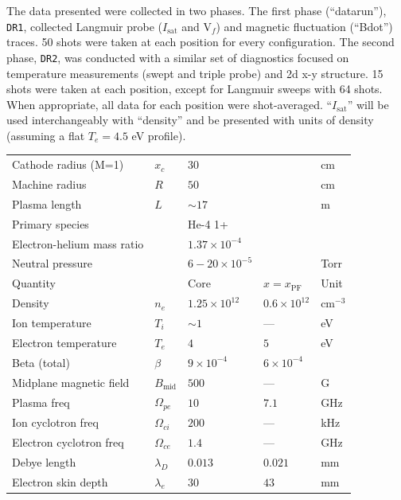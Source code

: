 The data presented were collected in two phases. The first phase (``datarun''), \texttt{DR1}, collected Langmuir probe ($I_\text{sat}$ and V$_f$) and magnetic fluctuation (``Bdot'') \cite{Everson_design_2009} traces. 50 shots were taken at each position for every configuration. 
The second phase, \texttt{DR2}, was conducted with a similar set of diagnostics focused on temperature measurements (swept and triple probe) and 2d x-y structure. 15 shots were taken at each position, except for Langmuir sweeps with 64 shots. When appropriate, all data for each position were shot-averaged.
``$I_\text{sat}$'' will be used interchangeably with ``density'' and be presented with units of density (assuming a flat $T_e = 4.5$ eV profile).

\begin{table}
    \centering
    \setlength\extrarowheight{-6pt}
    \begin{tabular}{l l l l l}
        Cathode radius (M=1) & $x_c$ & $30$ && cm \\
        Machine radius & $R$ & $50$ && cm \\
        Plasma length & $L$ & $\sim 17$ && m \\
        Primary species && He-4 1+ \\ 
        Electron-helium mass ratio && $1.37 \times 10^{-4}$ \\
        Neutral pressure && $6 - 20 \times 10^{-5}$ && Torr \\
        \hline
        Quantity &  & Core & $x=x_\text{PF}$ & Unit \\
        \hline
        Density & $n_e$ &  $1.25 \times 10^{12}$ & $ 0.6 \times 10^{12}$ & $\text{cm}^{-3}$ \\
        Ion temperature & $T_i$ & $\sim 1$ & — & eV \\
        Electron temperature & $T_e$ & $4$ & $5$ & eV \\
        Beta (total) & $\beta$ & $9 \times 10^{-4}$ & $6 \times 10^{-4}$ & \\
        Midplane magnetic field & $B_\text{mid}$ & $500$ & — & G \\
        Plasma freq & $\Omega_{pe}$ & $10$ & $7.1 $& GHz \\
        Ion cyclotron freq & $\Omega_{ci}$ & $200$ & — & kHz \\
        Electron cyclotron freq & $\Omega_{ce}$ & $1.4$ & — & GHz \\
        Debye length & $\lambda_D$ & $0.013$ & $0.021$ & mm \\
        Electron skin depth & $\lambda_{e}$ & $30$ & $43$ & mm\\

\end{tabular}
\end{table}
